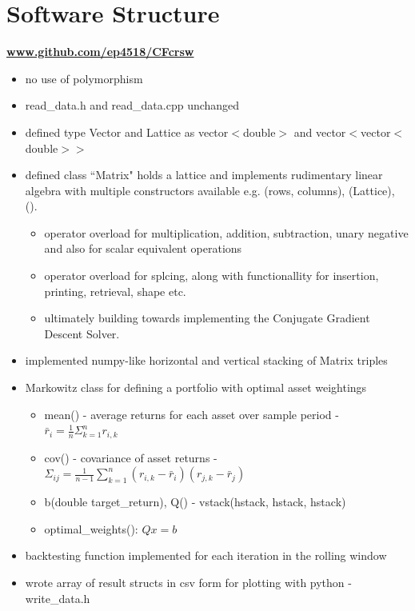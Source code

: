 \documentclass[12pt,twoside]{article}
\begin{document}


\section{Software Structure}
\textbf{\href{https://github.com/ep4518/CFcrsw}{www.github.com/ep4518/CFcrsw}}
\begin{itemize}[nosep]
    \item no use of polymorphism
    \item read\_data.h and read\_data.cpp unchanged
    \item defined type Vector and Lattice as vector$<$double$>$ and vector$<$vector$<$double$>$$>$
    \item defined class ``Matrix" holds a lattice and implements rudimentary linear algebra with multiple constructors available e.g. (rows, columns), (Lattice), ().
    \begin{itemize}[nosep]
        \item operator overload for multiplication, addition, subtraction, unary negative and also for scalar equivalent operations
        \item operator overload for splcing, along with functionallity for insertion, printing, retrieval, shape etc.
        \item ultimately building towards implementing the Conjugate Gradient Descent Solver.
    \end{itemize}
    \item implemented numpy-like horizontal and vertical stacking of Matrix triples
    \item Markowitz class for defining a portfolio with optimal asset weightings
    \begin{itemize}[nosep]
        \item mean() - average returns for each asset over sample period - $\bar{r}_i = \frac{1}{n}\Sigma_{k=1}^n r_{i,k} $
        \item cov() - covariance of asset returns - $\Sigma_{ij} = \frac{1}{n - 1}\sum_{k=1}^n (r_{i,k} - \bar{r}_i)(r_{j,k} - \bar{r}_j)$
        \item b(double target\_return), Q() - vstack(hstack, hstack, hstack)
        \item optimal\_weights(): $Q x = b$
    \end{itemize}
    \item backtesting function implemented for each iteration in the rolling window
    \item wrote array of result structs in csv form for plotting with python - write\_data.h
\end{itemize}
\end{document}
